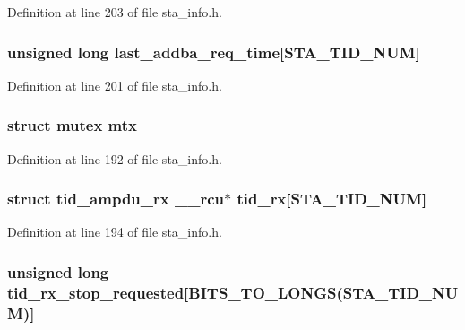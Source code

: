 Definition at line 203 of file sta\-\_\-info.\-h.

\hypertarget{structsta__ampdu__mlme_a811661f4c9a6505bfa7d3f74771e3157}{
\subsubsection[{last\-\_\-addba\-\_\-req\-\_\-time}]{\setlength{\rightskip}{0pt plus 5cm}unsigned long last\-\_\-addba\-\_\-req\-\_\-time\mbox{[}{\bf S\-T\-A\-\_\-\-T\-I\-D\-\_\-\-N\-U\-M}\mbox{]}}}\label{structsta__ampdu__mlme_a811661f4c9a6505bfa7d3f74771e3157}


Definition at line 201 of file sta\-\_\-info.\-h.

\hypertarget{structsta__ampdu__mlme_a06f637951b74c996f2e4987a7be1dbdd}{
\subsubsection[{mtx}]{\setlength{\rightskip}{0pt plus 5cm}struct mutex mtx}}\label{structsta__ampdu__mlme_a06f637951b74c996f2e4987a7be1dbdd}


Definition at line 192 of file sta\-\_\-info.\-h.

\hypertarget{structsta__ampdu__mlme_a9f02b8e803c3fad3c7f746477739b6c3}{
\subsubsection[{tid\-\_\-rx}]{\setlength{\rightskip}{0pt plus 5cm}struct {\bf tid\-\_\-ampdu\-\_\-rx} \-\_\-\-\_\-rcu$\ast$ tid\-\_\-rx\mbox{[}{\bf S\-T\-A\-\_\-\-T\-I\-D\-\_\-\-N\-U\-M}\mbox{]}}}\label{structsta__ampdu__mlme_a9f02b8e803c3fad3c7f746477739b6c3}


Definition at line 194 of file sta\-\_\-info.\-h.

\hypertarget{structsta__ampdu__mlme_aa9b2d44581dfa6af54bea5ad684e8b5f}{
\subsubsection[{tid\-\_\-rx\-\_\-stop\-\_\-requested}]{\setlength{\rightskip}{0pt plus 5cm}unsigned long tid\-\_\-rx\-\_\-stop\-\_\-requested\mbox{[}B\-I\-T\-S\-\_\-\-T\-O\-\_\-\-L\-O\-N\-G\-S({\bf S\-T\-A\-\_\-\-T\-I\-D\-\_\-\-N\-U\-M})\mbox{]}}}\label{structsta__ampdu__mlme_aa9b2d44581dfa6af54bea5ad684e8b5f}



